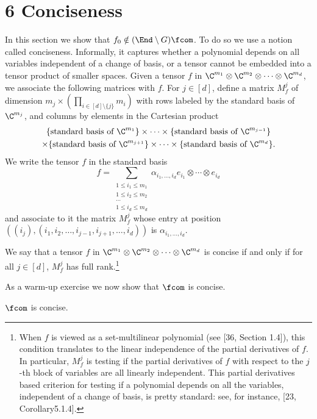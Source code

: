 \section*{6 Conciseness}
In this section we show that $f_0\notin(\End\setminus G)\fcom$. To do so we use a notion called conciseness. Informally, it captures whether a polynomial depends on all variables independent of a change of basis, or a tensor cannot be embedded into a tensor product of smaller spaces.
Given a tensor $f$ in $\C^{m_1}\otimes\C^{m_2}\otimes\cdots\otimes\C^{m_d}$, we associate the following matrices with $f$. For $j\in[d]$, define a matrix $M_f^j$ of dimension $m_j\times(\prod_{i\in[d]\setminus\{j\}}m_i)$ with rows labeled by the standard basis of $\C^{m_j}$, and columns by elements in the Cartesian product
\begin{multline*}
\{\text{standard basis of }\C^{m_1}\}\times\cdots\times\{\text{standard basis of }\C^{m_{j-1}}\}\\
\times\{\text{standard basis of }\C^{m_{j+1}}\}\times\cdots\times\{\text{standard basis of }\C^{m_d}\}.
\end{multline*}
We write the tensor $f$ in the standard basis
\[f=\sum_{\substack{1\le i_1\le m_1\\1\le i_2\le m_2\\\cdots\\1\le i_d\le m_d}}\alpha_{i_1,\ldots,i_d}e_{i_1}\otimes\cdots\otimes e_{i_d}\]
and associate to it the matrix $M_f^j$ whose entry at position $((i_j),(i_1,i_2,\ldots,i_{j-1},i_{j+1},\ldots,i_d))$ is $\alpha_{i_1,\ldots,i_d}$.
\begin{definition}
We say that a tensor $f$ in $\C^{m_1}\otimes\C^{m_2}\otimes\cdots\otimes\C^{m_d}$ is concise if and only if for all $j\in[d]$, $M_f^j$ has full rank.\footnote{When $f$ is viewed as a set-multilinear polynomial (see [36, Section 1.4]), this condition translates to the linear independence of the partial derivatives of $f$. In particular, $M_f^j$ is testing if the partial derivatives of $f$ with respect to the $j$-th block of variables are all linearly independent. This partial derivatives based criterion for testing if a polynomial depends on all the variables, independent of a change of basis, is pretty standard: see, for instance, [23, Corollary5.1.4].}
\end{definition}
As a warm-up exercise we now show that $\fcom$ is concise.
\begin{proposition}$\fcom$ is concise.\end{proposition}
